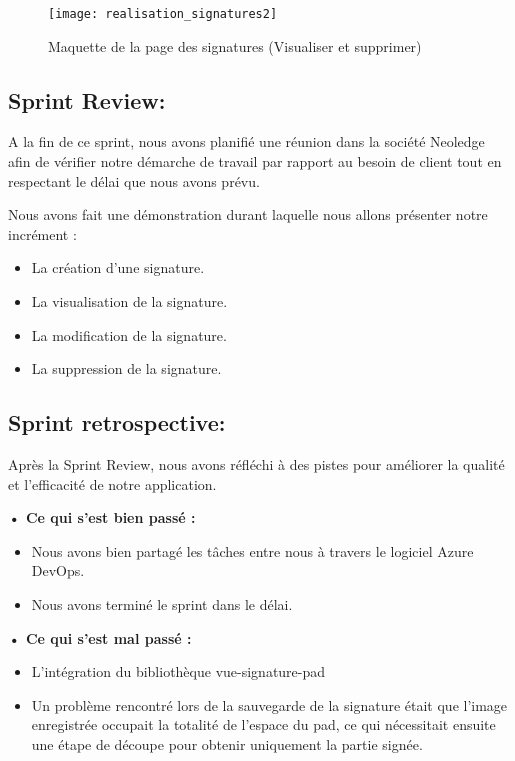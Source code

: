 \begin{figure}[H]
  \centering
  \texttt{[image: realisation\_signatures2]}
  \caption{Maquette de la page des signatures (Visualiser et supprimer)}
  \label{fig:realisation_preview_delete_signature}
\end{figure}



\subsection{Sprint Review:}
A la fin de ce sprint, nous avons planifié une réunion dans la société Neoledge afin de vérifier notre démarche de travail par rapport au besoin de client tout en respectant le délai que nous avons prévu.

Nous avons fait une démonstration durant laquelle nous allons présenter notre incrément :

\begin{itemize}
  \item La création d'une signature.
  \item La visualisation de la signature.
  \item La modification de la signature.
  \item La suppression de la signature.
\end{itemize}

\subsection{Sprint retrospective:}

Après la Sprint Review, nous avons réfléchi à des pistes pour améliorer la qualité et l'efficacité de notre application.

\noindent\textbf{•	Ce qui s'est bien passé :}
\begin{itemize}
  \item Nous avons bien partagé les tâches entre nous à travers le logiciel Azure DevOps. 
  \item Nous avons terminé le sprint dans le délai.
\end{itemize}

\noindent\textbf{•	Ce qui s'est mal passé :}
\begin{itemize}
  \item L'intégration du bibliothèque vue-signature-pad
  \item Un problème rencontré lors de la sauvegarde de la signature était que l'image enregistrée occupait la totalité de l'espace du pad, ce qui nécessitait ensuite une étape de découpe pour obtenir uniquement la partie signée.
\end{itemize}

